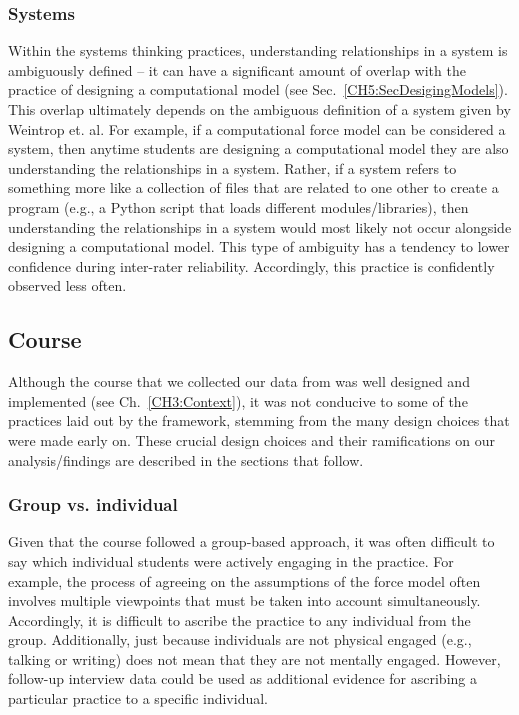 \documentclass{msuphddissertation}
\begin{document}
\begin{doublespace}
\subsubsection{Systems}

Within the systems thinking practices, understanding relationships in a system is ambiguously defined -- it can have a significant amount of overlap with the practice of designing a computational model (see Sec.~\ref{CH5:SecDesigingModels}).  This overlap ultimately depends on the ambiguous definition of a system given by Weintrop et. al.  For example, if a computational force model can be considered a system, then anytime students are designing a computational model they are also understanding the relationships in a system.  Rather, if a system refers to something more like a collection of files that are related to one other to create a program (e.g., a Python script that loads different modules/libraries), then understanding the relationships in a system would most likely not occur alongside designing a computational model.  This type of ambiguity has a tendency to lower confidence during inter-rater reliability.  Accordingly, this practice is confidently observed less often.

\subsection{Course}\label{CH6:Context}

Although the course that we collected our data from was well designed and implemented (see Ch.~\ref{CH3:Context}), it was not conducive to some of the practices laid out by the framework, stemming from the many design choices that were made early on.  These crucial design choices and their ramifications on our analysis/findings are described in the sections that follow.

\subsubsection{Group vs. individual}

Given that the course followed a group-based approach, it was often difficult to say which individual students were actively engaging in the practice.  For example, the process of agreeing on the assumptions of the force model often involves multiple viewpoints that must be taken into account simultaneously.  Accordingly, it is difficult to ascribe the practice to any individual from the group.  Additionally, just because individuals are not physical engaged (e.g., talking or writing) does not mean that they are not mentally engaged.  However, follow-up interview data could be used as additional evidence for ascribing a particular practice to a specific individual.


\end{doublespace}
\end{document}

